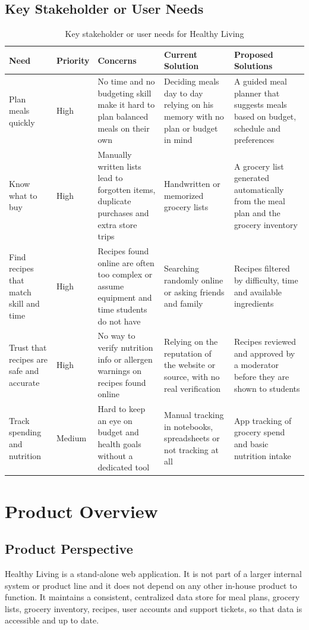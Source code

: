 \documentclass[10pt,letterpaper]{article}
\begin{document}
\subsection{Key Stakeholder or User Needs}
\begin{table}[h!]
\centering
\caption{Key stakeholder or user needs for Healthy Living}
\label{tab:user-needs}
\small
\begin{tabularx}{\textwidth}{|p{}|p{}|X|X|X|}
\hline
\textbf{Need} & \textbf{Priority} & \textbf{Concerns} & \textbf{Current Solution} & \textbf{Proposed Solutions} \\
\hline
Plan meals quickly & High & No time and no budgeting skill make it hard to plan balanced meals on their own & Deciding meals day to day relying on his memory with no plan or budget in mind & A guided meal planner that suggests meals based on budget, schedule and preferences \\
\hline
Know what to buy & High & Manually written lists lead to forgotten items, duplicate purchases and extra store trips & Handwritten or memorized grocery lists & A grocery list generated automatically from the meal plan and the grocery inventory\\
\hline
Find recipes that match skill and time & High & Recipes found online are often too complex or assume equipment and time students do not have & Searching randomly online or asking friends and family & Recipes filtered by difficulty, time and available ingredients \\
\hline
Trust that recipes are safe and accurate & High & No way to verify nutrition info or allergen warnings on recipes found online & Relying on the reputation of the website or source, with no real verification & Recipes reviewed and approved by a moderator before they are shown to students \\
\hline
Track spending and nutrition & Medium & Hard to keep an eye on budget and health goals without a dedicated tool & Manual tracking in notebooks, spreadsheets or not tracking at all & App tracking of grocery spend and basic nutrition intake \\
\hline
\end{tabularx}
\end{table}

\section{Product Overview}

\subsection{Product Perspective}
Healthy Living is a stand-alone web application. It is not part of a larger internal system or product line and it does not depend on any other in-house product to function. It maintains a consistent, centralized data store for meal plans, grocery lists, grocery inventory, recipes, user accounts and support tickets, so that data is accessible and up to date.
\end{document}
